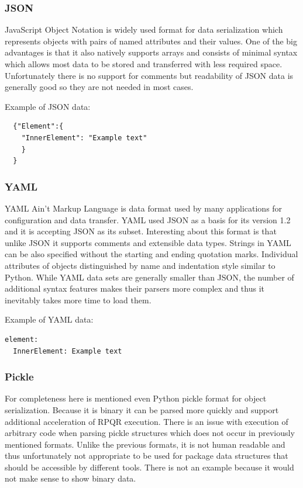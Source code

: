 \subsubsection*{JSON}
JavaScript Object Notation\cite{JSONFormat} is widely used format for data serialization which represents objects
with pairs of named attributes and their values. One of the big advantages is that it also natively
supports arrays and consists of minimal syntax which allows most data to be stored and transferred
with less required space. Unfortunately there is no support for comments but readability of JSON
data is generally good so they are not needed in most cases.

Example of JSON data:
\begin{lstlisting}
  {"Element":{
    "InnerElement": "Example text"
    }
  }
\end{lstlisting}

\subsubsection*{YAML}
YAML\cite{YAMLFormat} Ain't Markup Language is data format used by many applications for configuration and data
transfer. YAML used JSON as a basis for its version 1.2 and it is accepting JSON as its subset.
Interesting about this format is that unlike JSON it supports comments and extensible data types.
Strings in YAML can be also specified without the starting and ending quotation marks. Individual
attributes of objects distinguished by name and indentation style similar to Python. While
YAML data sets are generally smaller than JSON, the number of additional syntax features makes
their parsers more complex and thus it inevitably takes more time to load them.
\newpage

Example of YAML data:
\begin{lstlisting}
element:
  InnerElement: Example text
\end{lstlisting}

\subsubsection*{Pickle}
For completeness here is mentioned even Python pickle format\cite{PickleFormat} for object serialization. Because
it is binary it can be parsed more quickly and support additional acceleration of RPQR execution.
There is an issue with execution of arbitrary code when parsing pickle structures which does not
occur in previously mentioned formats. Unlike the previous formats, it is not human readable
and thus unfortunately not appropriate to be used for package data structures that should be accessible
by different tools.
There is not an example because it would not make sense to show binary data.

